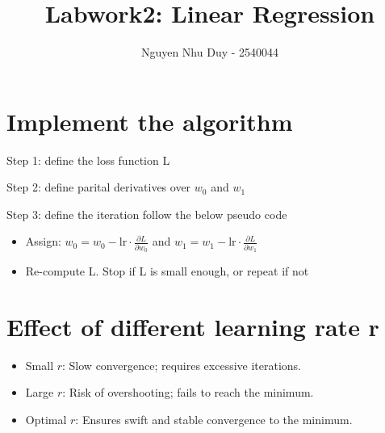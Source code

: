 \documentclass{article}
\title{Labwork2: Linear Regression}
\author{Nguyen Nhu Duy - 2540044}
\begin{document}
\setlength{\parindent}{0pt}
\maketitle
\section{Implement the algorithm}
Step 1: define the loss function L

Step 2: define parital derivatives over $w_0$ and $w_1$

Step 3: define the iteration follow the below pseudo code

\begin{itemize}
    \item Assign: $w_0 = w_0 - \mathrm{lr} \cdot \frac{\partial L}{\partial w_0}$ and $w_1 = w_1 - \mathrm{lr} \cdot \frac{\partial L}{\partial w_1}$
    
    \item  Re-compute L. Stop if L is small enough, or repeat if not
\end{itemize}

\section{Effect of different learning rate r}
\begin{itemize}
    \item Small $r$: Slow convergence; requires excessive iterations.
    \item Large $r$: Risk of overshooting; fails to reach the minimum.
    \item Optimal $r$: Ensures swift and stable convergence to the minimum.
\end{itemize}
\end{document}
